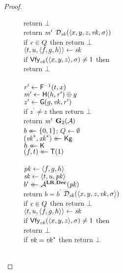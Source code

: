 \begin{proof}
\begin{figure}
{          return $\bot$\\
        return $\mathit{m}^\prime$
    }
    {
      \underline{$\mathcal{D}_{\mathit{sk}}(\langle x,y,z,\mathit{vk},\sigma \rangle)$}
          \hfill {}\\[2pt]
        if $\mathit{c} \in Q$ then return $\bot$\\
        $\langle t, u, \langle f, g, h \rangle \rangle \gets \mathit{sk}$\\
        if $\mathsf{Vfy}_{\mathit{vk}}(\langle x,y,z \rangle,\sigma) \ne 1$ then\\
        \tab return $\bot$\\
        \\
        $\mathit{r}^\prime \gets \mathsf{F}^{-1}(t, x)$\\
        $\mathit{m}^\prime \gets \mathsf{H}(h,\mathit{r}^\prime) \oplus y$\\
        $z^\prime \gets \mathsf{G}(g,\mathit{vk},\mathit{r}^\prime)$\\
        if $z^\prime \ne z$ then
          return $\bot$\\
        return $\mathit{m}^\prime$
    }
    {
      \underline{$\mathbf{G}_2(\mathcal{A})$}
          \hfill {}\\[2pt]
        $b \mathrel{\leftarrow\mkern-14mu\leftarrow} \{0,1\}$; $Q \gets \emptyset$\\
        $(\mathit{vk}^*, \mathit{xk}^*) \mathrel{\leftarrow\mkern-14mu\leftarrow} \mathsf{Kg}$\\
        $h \mathrel{\leftarrow\mkern-14mu\leftarrow} \mathsf{K}$\\
        $(f, t) \mathrel{\leftarrow\mkern-14mu\leftarrow} \mathsf{T}(1)$\\
        \\
        $\mathit{pk} \gets \langle f, g, h \rangle$\\
        $\mathit{sk} \gets \langle t, u, \mathit{pk} \rangle$\\
        $b^\prime \mathrel{\leftarrow\mkern-14mu\leftarrow} \mathcal{A}^{\mathbf{LR},\mathbf{Dec}}(\mathit{pk})$\\
        return $b=b^\prime$
    }
    {
      \underline{$\mathcal{D}_{\mathit{sk}}(\langle x,y,z,\mathit{vk},\sigma \rangle)$}
          \hfill {}\\[2pt]
        if $\mathit{c} \in Q$ then return $\bot$\\
        $\langle t, u, \langle f, g, h \rangle \rangle \gets \mathit{sk}$\\
        if $\mathsf{Vfy}_{\mathit{vk}}(\langle x,y,z \rangle,\sigma) \ne 1$ then\\
        \tab return $\bot$\\
        if $\mathit{vk} = \mathit{vk}^*$ then return $\bot$\\
        \\
}
\end{figure}
\end{proof}
